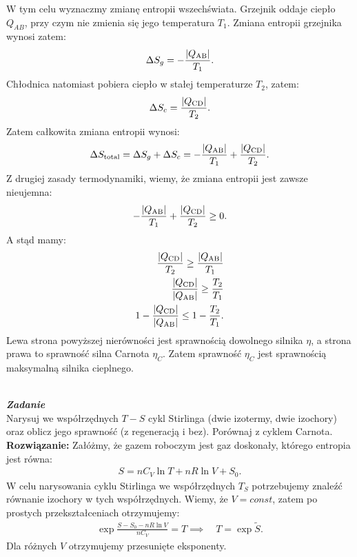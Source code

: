 \documentclass[11pt,a4paper]{article}
\newcounter{zadanie}\newcommand{\zadanie}[1][]{\addtocounter{zadanie}{1} ~\\  {\bf \emph{Zadanie \arabic{zadanie} #1 }} \\}
\begin{document}
W tym celu wyznaczmy zmianę entropii wszechświata. Grzejnik oddaje ciepło $Q_{AB}$, przy czym nie zmienia się jego temperatura $T_1$. Zmiana entropii grzejnika wynosi zatem:
\begin{align}
\Delta S_g = - \frac{|Q_{\rm AB}|}{T_1}.
\end{align}
Chłodnica natomiast pobiera ciepło w stałej temperaturze $T_2$, zatem:
\begin{align}
\Delta S_c=  \frac{|Q_{\rm CD}|}{T_2}.
\end{align}
Zatem całkowita zmiana entropii wynosi:
\begin{align}
\Delta S_{\text{total}} = \Delta S_g + \Delta S_c = - \frac{|Q_{\rm AB}|}{T_1}+ \frac{|Q_{\rm CD}|}{T_2}.
\end{align}
Z drugiej zasady termodynamiki, wiemy, że zmiana entropii jest zawsze nieujemna:
\begin{align}
- \frac{|Q_{\rm AB}|}{T_1}+ \frac{|Q_{\rm CD}|}{T_2} \geq 0.
\end{align}
A stąd mamy:
\begin{align}
\frac{|Q_{\rm CD}|}{T_2}  \geq  \frac{|Q_{\rm AB}|}{T_1}\\
\frac{|Q_{\rm CD}|}{|Q_{\rm AB}|} \geq \frac{T_2}{T_1}\\
1- \frac{|Q_{\rm CD}|}{|Q_{\rm AB}|}  \leq 1 -  \frac{T_2}{T_1}.
\end{align}
Lewa strona powyższej nierówności jest sprawnością dowolnego silnika $\eta$, a strona prawa to sprawność silna Carnota $\eta_C$. Zatem sprawność $\eta_C$ jest sprawnością maksymalną silnika cieplnego.\\
\newpage
\zadanie
Narysuj we współrzędnych $T-S$ cykl Stirlinga (dwie izotermy, dwie izochory) 
oraz oblicz jego sprawność (z regeneracją i bez).
Porównaj z cyklem Carnota.
\\
\textbf{Rozwiązanie:}
Załóżmy, że gazem roboczym jest gaz doskonały, którego entropia jest równa:
\begin{align}
S =n C_V \ln{T} + nR \ln{V} + S_0. 
\end{align}
W celu narysowania cyklu Stirlinga we współrzędnych $T_S$ potrzebujemy znaleźć równanie izochory w tych współrzędnych. Wiemy, że $V=const$, zatem po prostych przekształceniach otrzymujemy:
\begin{align}
\exp{\frac{S-S_0 - nR \ln{V}}{n C_V}} = T \implies \quad T = \exp{\tilde{S}}.
\end{align}
Dla różnych $V$ otrzymujemy przesunięte eksponenty.\\
\end{document}
